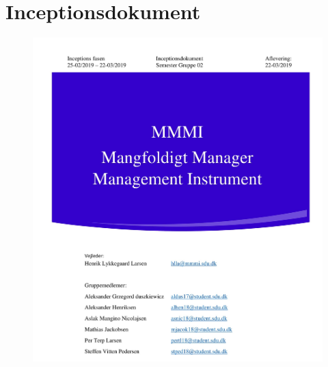 
\section{Inceptionsdokument}

\begin{figure}[hb]
\begin{center}
  \includegraphics[scale = 0.33]{./PNG/Inceptions/Gruppe02+InceptionsDokument-01.jpg} 
\end{center}
\end{figure}



